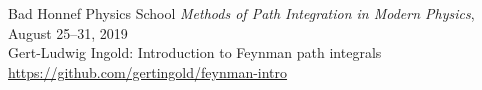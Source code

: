 \begin{footnotesize}
Bad Honnef Physics School \textit{Methods of Path Integration in Modern Physics},
August 25--31, 2019\\
Gert-Ludwig Ingold: Introduction to Feynman path integrals\\
 \url{https://github.com/gertingold/feynman-intro}\\
\vbox{\hrulefill}
\end{footnotesize}

